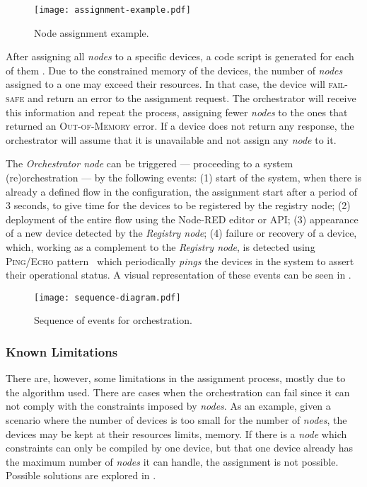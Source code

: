 \begin{figure}[h]
\centering
\texttt{[image: assignment-example.pdf]}
\caption[Node assignment example.]{Node assignment example.}\label{fig:assigment_example}
\end{figure}

After assigning all \textit{nodes} to a specific devices, a code script is generated for each of them . Due to the constrained memory of the devices, the number of \textit{nodes} assigned to a one may exceed their resources. In that case, the device will \textsc{fail-safe} and return an error to the assignment request. The orchestrator will receive this information and repeat the process, assigning fewer \textit{nodes} to the ones that returned an \textsc{Out-of-Memory} error. If a device does not return any response, the orchestrator will assume that it is unavailable and not assign any \textit{node} to it.

The \textit{Orchestrator node} can be triggered --- proceeding to a system (re)orchestration --- by the following events: (1) start of the system, when there is already a defined flow in the configuration, the assignment start after a period of 3 seconds, to give time for the devices to be registered by the registry node; (2) deployment of the entire flow using the Node-RED editor or API; (3) appearance of a new device detected by the \textit{Registry node}; (4) failure or recovery of a device, which, working as a complement to the \textit{Registry node}, is detected using \textsc{Ping/Echo} pattern~\cite{Scott2009} which periodically \textit{pings} the devices in the system to assert their operational status. A visual representation of these events can be seen in . 

\begin{figure}[h]
\centering
\texttt{[image: sequence-diagram.pdf]}
\caption[Sequence of events for orchestration.]{Sequence of events for orchestration.}\label{fig:sequence_diagram}
\end{figure}

\subsubsection{Known Limitations}\label{sec:solution_known_limitations}

There are, however, some limitations in the assignment process, mostly due to the algorithm used. There are cases when the orchestration can fail since it can not comply with the constraints imposed by \textit{nodes}. As an example, given a scenario where the number of devices is too small for the number of \textit{nodes}, the devices may be kept at their resources limits, \ie memory. If there is a \textit{node} which constraints can only be compiled by one device, but that one device already has the maximum number of \textit{nodes} it can handle, the assignment is not possible. Possible solutions are explored in .

